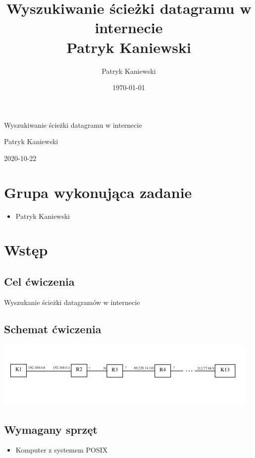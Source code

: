 \documentclass[11pt]{article}
\author{Patryk Kaniewski}
\date{\today}
\title{Wyszukiwanie ścieżki datagramu w internecie \\
Patryk Kaniewski}
\begin{document}
\begin{titlepage}
\begin{center}
{\Huge Wyszukiwanie ścieżki datagramu w internecie \par}
\vspace{2cm}
{\Large Patryk Kaniewski \par
}\vspace{2cm}
{\large 2020-10-22}
\end{center}
\end{titlepage}
\setcounter{tocdepth}{2}
\tableofcontents \clearpage

\section{Grupa wykonująca zadanie}
\label{sec:orgcbd3574}
\begin{itemize}
\item Patryk Kaniewski
\end{itemize}

\section{Wstęp}
\label{sec:org97ad078}
\subsection{Cel ćwiczenia}
\label{sec:org3a11b9a}
Wyszukanie ścieżki datagramów w internecie
\subsection{Schemat ćwiczenia}
\label{sec:org9bb123f}
\begin{center}
\includegraphics[width=.9\linewidth]{./schemat.png}
\end{center}
\subsection{Wymagany sprzęt}
\label{sec:org2d1170c}
\begin{itemize}
\item Komputer z systemem POSIX
\end{itemize}
\end{document}
